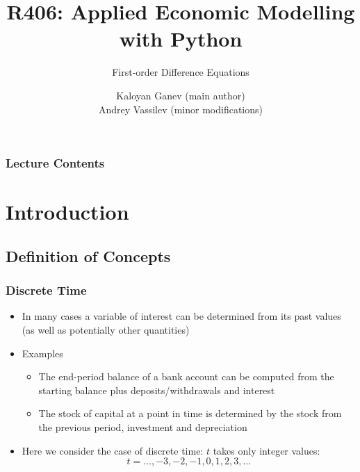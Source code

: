 \documentclass[10pt,usenames,dvipsnames]{beamer}
\title{R406: Applied Economic Modelling with Python}
\subtitle{\textcolor{myred}{First-order Difference Equations}}
\author[Kaloyan Ganev,  Andrey Vassilev]{Kaloyan Ganev (main author) \\
Andrey Vassilev (minor modifications)}
\date{}
\theoremstyle{plain}
\theoremstyle{definition}
\begin{document}
\maketitle

\begin{frame}[fragile]
\frametitle{Lecture Contents}
\tableofcontents
\end{frame}

\section{Introduction}
\subsection{Definition of Concepts}
\begin{frame}[fragile]
\frametitle{Discrete Time}
\begin{itemize}
	\item In many cases a variable of interest can be determined from its past values (as well as potentially other quantities)
	\item Examples
		\begin{itemize}
		\item The end-period balance of a bank account can be computed from the starting balance plus deposits/withdrawals and interest
		\item The stock of capital at a point in time is determined by the stock from the previous period, investment and depreciation
		\end{itemize}
	\item Here we consider the case of discrete time: $t$ takes only integer values:
	\[
		t = \ldots, -3, -2, -1, 0, 1, 2, 3,\ldots
	\]
\end{itemize}
\end{frame}
\end{document}

